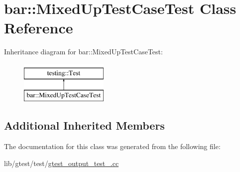 \hypertarget{classbar_1_1_mixed_up_test_case_test}{\section{bar\-:\-:Mixed\-Up\-Test\-Case\-Test Class Reference}
\label{classbar_1_1_mixed_up_test_case_test}
}
Inheritance diagram for bar\-:\-:Mixed\-Up\-Test\-Case\-Test\-:\begin{figure}[H]
\begin{center}
\leavevmode
\includegraphics[height=2.000000cm]{classbar_1_1_mixed_up_test_case_test}
\end{center}
\end{figure}
\subsection*{Additional Inherited Members}


The documentation for this class was generated from the following file\-:\begin{DoxyCompactItemize}
\item 
lib/gtest/test/\hyperlink{gtest__output__test___8cc}{gtest\-\_\-output\-\_\-test\-\_\-.\-cc}\end{DoxyCompactItemize}
